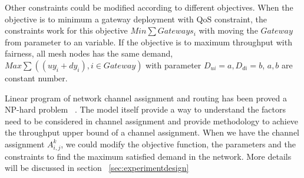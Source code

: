 Other constraints could be modified according to different objectives. 
When the objective is to minimum a gateway deployment with QoS constraint, the constraints work for this objective $Min \sum{Gateways_i}$ with moving the $Gateway$ from parameter to an variable.
If the objective is to maximum throughput with fairness, all mesh nodes has the same demand, $Max\sum((uy_i+dy_i),i \in Gateway)$ 
with parameter $D_{ui}=a,D_{di}=b$, $a,b$ are constant number.

Linear program of network channel assignment and routing has been proved a NP-hard problem ~\cite{tang2005interference,yuan2006cross}. 
The model itself provide a way to understand the factors need to be considered in channel assignment and provide methodology to achieve the throughput upper bound of a channel assignment.
When we have the channel assignment $A_{i,j}^k$, we could modify the objective function, the parameters and the constraints to find the maximum satisfied demand in the network. More details will be discussed in section ~\ref{sec:experimentdesign} 





